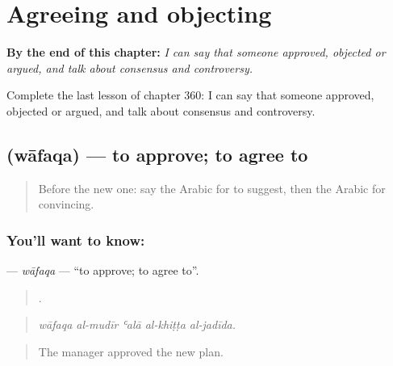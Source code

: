 
\chapter{Agreeing and objecting}
\label{ch:ar-agreeing-and-objecting}

\begin{chapteropening}
\textbf{By the end of this chapter:} \emph{I can say that someone approved, objected or argued, and talk about consensus and controversy.}

Complete the last lesson of chapter 360: I can say that someone approved, objected or argued, and talk about consensus and controversy.
\end{chapteropening}

\section[\texorpdfstring{\ar{وافق} (wāfaqa)}{وافق (wāfaqa)}]{ (wāfaqa) — to approve; to agree to}

\label{lesson:AR-C360-wafaqa}



\begin{quote}
Before the new one: say the Arabic for to suggest, then the Arabic for convincing.
\end{quote}

\subsection*{You'll want to know: }
\textbf{} — \emph{wāfaqa} — \textquotedblleft{}to approve; to agree to\textquotedblright{}.

\begin{quote}
    .
\end{quote}

\begin{quote}
\emph{wāfaqa al-mudīr ʿalā al-khiṭṭa al-jadīda.}
\end{quote}

\begin{quote}
The manager approved the new plan.
\end{quote}

